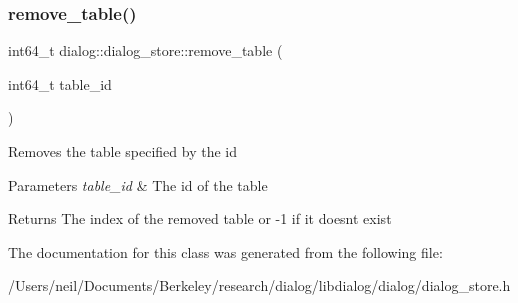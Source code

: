 \subsubsection{\texorpdfstring{remove\+\_\+table()}{remove\_table()}\hspace{0.1cm}{\footnotesize\ttfamily [2/2]}}
{\footnotesize\ttfamily int64\+\_\+t dialog\+::dialog\+\_\+store\+::remove\+\_\+table (\begin{DoxyParamCaption}\item[{int64\+\_\+t}]{table\+\_\+id }\end{DoxyParamCaption})\hspace{0.3cm}{\ttfamily [inline]}}

Removes the table specified by the id 
\begin{DoxyParams}{Parameters}
{\em table\+\_\+id} & The id of the table \\
\hline
\end{DoxyParams}
\begin{DoxyReturn}{Returns}
The index of the removed table or -\/1 if it doesn\textquotesingle{}t exist 
\end{DoxyReturn}


The documentation for this class was generated from the following file\+:\begin{DoxyCompactItemize}
\item 
/\+Users/neil/\+Documents/\+Berkeley/research/dialog/libdialog/dialog/dialog\+\_\+store.\+h\end{DoxyCompactItemize}

